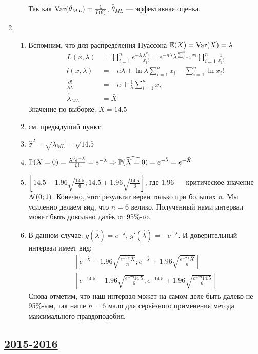 \begin{enumerate}
\begin{enumerate}
  Так как $\Var(\hat{\theta}_{ML}) = \frac{1}{I(\theta)}$, $\hat{\theta}_{ML}$ — эффективная оценка.
\end{enumerate}
\item
\begin{enumerate}
\item Вспомним, что для распределения Пуассона $\E(X) = \Var(X) = \lambda$
\begin{align*}
  L(x, \lambda) &= \prod_{i=1}^n e^{-\lambda} \frac{\lambda^{x_i}}{x_i!} = e^{-n\lambda} \lambda^{\sum_{i=1}^n x_i} \prod_{i=1}^n \frac{1}{x_i!} \\
  l(x, \lambda) &= -n\lambda + \ln\lambda \sum_{i=1}^n x_i - \sum_{i=1}^n \ln x_i! \\
  \frac{\partial l}{\partial \lambda} &= -n + \frac{1}{\lambda} \sum_{i=1}^n x_i \\
  \hat{\lambda}_{ML} &= \bar{X}
\end{align*}
Значение по выборке: $\bar{X} = 14.5$
\item см. предыдущий пункт
\item $\hat \sigma^2 = \sqrt{\lambda_{ML}} = \sqrt{14.5}$
\item $\P(X=0) = \frac{\lambda^0 e^{-\lambda}}{0!} = e^{-\lambda} \Rightarrow \widehat{\P(X=0)} = e^{-\hat\lambda} = e^{-\bar{X}}$
\item $\left[14.5 - 1.96 \sqrt{\frac{14.5}{6}}; 14.5 + 1.96 \sqrt{\frac{14.5}{6}}\right]$, где $1.96$ — критическое значение $\cN(0;1)$. Конечно, этот результат верен только при больших $n$. Мы усиленно делаем вид, что $n=6$ велико. Полученный нами интервал может быть довольно далёк от 95\%-го.
\item В данном случае: $g(\hat{\lambda}) = e^{-\hat\lambda}$, $g'(\hat\lambda) = -e^{-\hat\lambda}$.
И доверительный интервал имеет вид:
\begin{align*}
  \left[e^{-\bar{X}} - 1.96 \sqrt{\frac{e^{-2\bar{X}}\bar{X}}{n}}; e^{-\bar{X}} + 1.96 \sqrt{\frac{e^{-2\bar{X}}\bar{X}}{n}} \right] \\
  \left[e^{-14.5} - 1.96 \sqrt{\frac{e^{-29}14.5}{6}}; e^{-14.5} + 1.96 \sqrt{\frac{e^{-29}14.5}{6}} \right]
\end{align*}
Снова отметим, что наш интервал может на самом деле быть далеко не 95\%-ым, так наше $n=6$ мало для серьёзного применения метода максимального правдоподобия.
\end{enumerate}
\end{enumerate}



\subsection[2015-2016]{\hyperref[sec:kr_03_2015_2016]{2015-2016}}
\label{sec:sol_kr_03_2015_2016}

